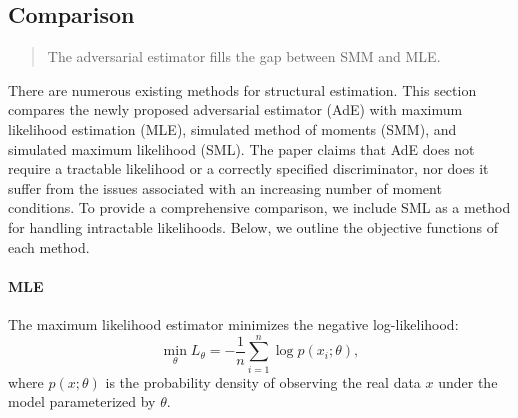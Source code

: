 \documentclass[12pt]{article}
\begin{document}

\subsection{Comparison} \label{subsec:comparison}
\begin{quote}
    The adversarial estimator fills the gap between SMM and MLE.
\end{quote}

There are numerous existing methods for structural estimation. This section
compares the newly proposed adversarial estimator (AdE) with maximum likelihood
estimation (MLE), simulated method of moments (SMM), and simulated maximum
likelihood (SML). The paper claims that AdE does not require a tractable
likelihood or a correctly specified discriminator, nor does it suffer from the
issues associated with an increasing number of moment conditions. To provide a
comprehensive comparison, we include SML as a method for handling intractable
likelihoods. Below, we outline the objective functions of each method.

\paragraph{MLE}
The maximum likelihood estimator minimizes the negative log-likelihood:
\begin{equation*}
    \min_\theta L_\theta = -\frac{1}{n} \sum_{i=1}^n \log p(x_i; \theta),
\end{equation*}
where \(p(x; \theta)\) is the probability density of observing the real data \(x\) under the model parameterized by \(\theta\).
\end{document}
